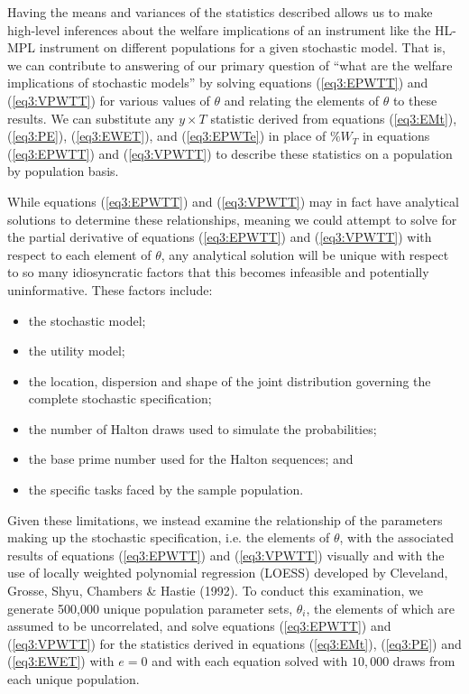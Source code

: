 \documentclass[../main.tex]{subfiles}
\begin{document}
Having the means and variances of the statistics described allows us to make high-level inferences about the welfare implications of an instrument like the HL-MPL instrument on different populations for a given stochastic model.
That is, we can contribute to answering of our primary question of \enquote{what are the welfare implications of stochastic models} by solving equations (\ref{eq3:EPWTT}) and (\ref{eq3:VPWTT}) for various values of $\theta$ and relating the elements of $\theta$ to these results.
We can substitute any  $y \times T$ statistic derived from equations (\ref{eq3:EMt}), (\ref{eq3:PE}), (\ref{eq3:EWET}), and (\ref{eq3:EPWTe}) in place of $\%W_T$ in equations (\ref{eq3:EPWTT}) and (\ref{eq3:VPWTT}) to describe these statistics on a population by population basis.

While equations (\ref{eq3:EPWTT}) and (\ref{eq3:VPWTT}) may in fact have analytical solutions to determine these relationships, meaning we could attempt to solve for the partial derivative of equations (\ref{eq3:EPWTT}) and (\ref{eq3:VPWTT}) with respect to each element of $\theta$, any analytical solution will be unique with respect to so many idiosyncratic factors that this becomes infeasible and potentially uninformative.
These factors include:
\begin{itemize}
 \setlength\itemsep{-.25em}
	\item the stochastic model;
	\item the utility model;
	\item the location, dispersion and shape of the joint distribution governing the complete stochastic specification;
	\item the number of Halton draws used to simulate the probabilities;
	\item the base prime number used for the Halton sequences; and
	\item the specific tasks faced by the sample population.
\end{itemize}
\noindent Given these limitations, we instead examine the relationship of the parameters making up the stochastic specification, i.e. the elements of $\theta$, with the associated results of equations (\ref{eq3:EPWTT}) and (\ref{eq3:VPWTT}) visually and with the use of locally weighted polynomial regression (LOESS) developed by Cleveland, Grosse, Shyu, Chambers \& Hastie (1992).
To conduct this examination, we generate 500,000 unique population parameter sets, $\theta_i$, the elements of which are assumed to be uncorrelated, and solve equations (\ref{eq3:EPWTT}) and (\ref{eq3:VPWTT}) for the statistics derived in equations (\ref{eq3:EMt}), (\ref{eq3:PE}) and (\ref{eq3:EWET}) with $e=0$ and with each equation solved with $10,000$ draws from each unique population.
\end{document}
